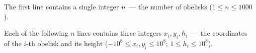 The first line contains a single integer $n$~--- the number of obelisks ($1 \le n \le 1000$).

Each of the following $n$ lines contains three integers $x_i, y_i, h_i$~--- the coordinates of the $i$-th obelisk and its height ($-10^8 \le x_i, y_i \le 10^8$; $1 \le h_i \le 10^8$).

